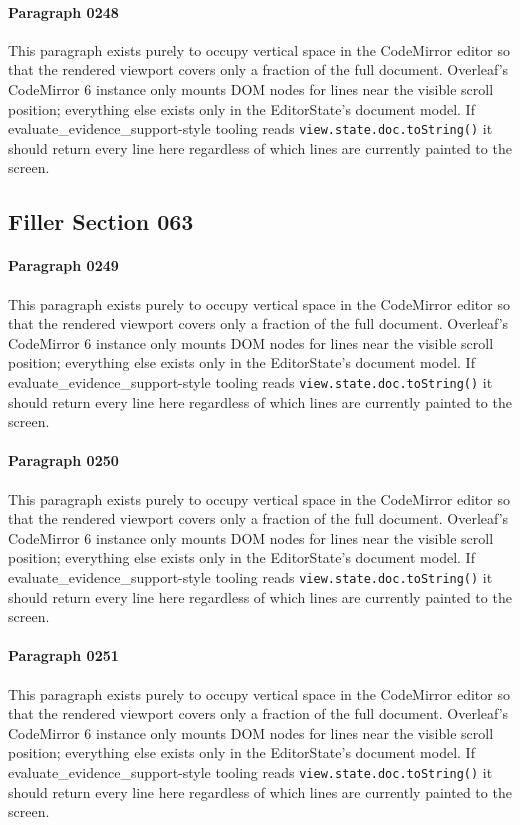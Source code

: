 \documentclass{article}
\begin{document}
\paragraph{Paragraph 0248}
This paragraph exists purely to occupy vertical space in the CodeMirror editor so that the rendered viewport covers only a fraction of the full document. Overleaf's CodeMirror 6 instance only mounts DOM nodes for lines near the visible scroll position; everything else exists only in the EditorState's document model. If evaluate\_evidence\_support-style tooling reads \texttt{view.state.doc.toString()} it should return every line here regardless of which lines are currently painted to the screen.

\subsection{Filler Section 063}
\paragraph{Paragraph 0249}
This paragraph exists purely to occupy vertical space in the CodeMirror editor so that the rendered viewport covers only a fraction of the full document. Overleaf's CodeMirror 6 instance only mounts DOM nodes for lines near the visible scroll position; everything else exists only in the EditorState's document model. If evaluate\_evidence\_support-style tooling reads \texttt{view.state.doc.toString()} it should return every line here regardless of which lines are currently painted to the screen.

\paragraph{Paragraph 0250}
This paragraph exists purely to occupy vertical space in the CodeMirror editor so that the rendered viewport covers only a fraction of the full document. Overleaf's CodeMirror 6 instance only mounts DOM nodes for lines near the visible scroll position; everything else exists only in the EditorState's document model. If evaluate\_evidence\_support-style tooling reads \texttt{view.state.doc.toString()} it should return every line here regardless of which lines are currently painted to the screen.

\paragraph{Paragraph 0251}
This paragraph exists purely to occupy vertical space in the CodeMirror editor so that the rendered viewport covers only a fraction of the full document. Overleaf's CodeMirror 6 instance only mounts DOM nodes for lines near the visible scroll position; everything else exists only in the EditorState's document model. If evaluate\_evidence\_support-style tooling reads \texttt{view.state.doc.toString()} it should return every line here regardless of which lines are currently painted to the screen.
\end{document}
